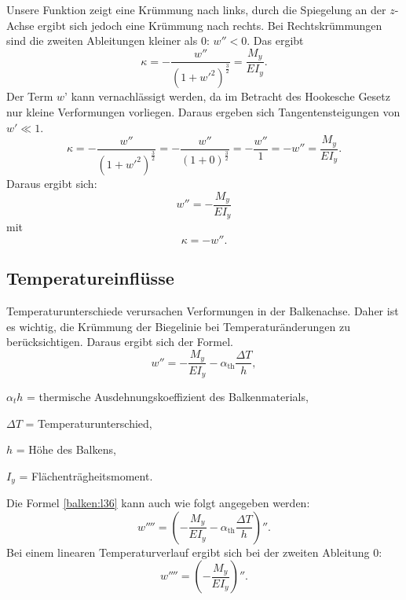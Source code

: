 Unsere Funktion zeigt eine Krümmung nach links,
durch die Spiegelung an der $z$-Achse ergibt sich
jedoch eine Krümmung nach rechts.
Bei Rechtskrümmungen sind die zweiten Ableitungen kleiner als 0: $w'' < 0$.
Das ergibt
\begin{equation*}
	\kappa=
	-\frac{w''}{\left(1+{w'}^2\right)^\frac{3}{2}}=
	\frac{M_y}{EI_y}.
\end{equation*}
Der Term $w’$ kann vernachlässigt werden, da im Betracht des Hookesche Gesetz nur kleine Verformungen vorliegen.
Daraus ergeben sich Tangentensteigungen von $w' \ll 1$.
\begin{equation*}
	\kappa=
	-\frac{w''}{\left(1+{w'}^2\right)^\frac{3}{2}}=
	-\frac{w''}{\left(1+0\right)^\frac{3}{2}}=
	-\frac{w''}{1}=-w''=
	\frac{M_y}{EI_y}.
\end{equation*}
Daraus ergibt sich:
\begin{equation*}
	w''=
	-\frac{M_y}{EI_y}
\end{equation*}
mit
\begin{equation*}
	\kappa=
	-w''.
\end{equation*}

\subsection{Temperatureinflüsse}
Temperaturunterschiede verursachen Verformungen in der Balkenachse.
%
Daher ist es wichtig, die Krümmung der Biegelinie bei Temperaturänderungen zu berücksichtigen.
Daraus ergibt sich der Formel.
\begin{equation}
	w''=
	-\frac{M_y}{EI_y}-\alpha_{\text{th}}\frac{\Delta T}{h},
\label{balken:l36}
\end{equation}

$α_th$ = thermische Ausdehnungskoeffizient des Balkenmaterials,

$\Delta T$ = Temperaturunterschied,

$h$ = Höhe des Balkens,

$I_y$ = Flächenträgheitsmoment.

Die Formel \eqref{balken:l36} kann auch wie folgt angegeben werden:
\begin{equation*}
	w''''=
	\left(-\frac{M_y}{EI_y}-\alpha_{\text{th}}\frac{\Delta T}{h}\right)''.
\end{equation*}
Bei einem linearen Temperaturverlauf ergibt sich bei der zweiten Ableitung 0:
\begin{equation*}
	w''''=
	\left(-\frac{M_y}{EI_y}\right)''.
\end{equation*}

